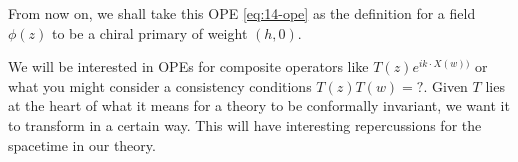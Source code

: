 From now on, we shall take this OPE \eqref{eq:14-ope} as the definition for a field $\phi(z)$ to be a chiral primary of weight $(h, 0)$.

We will be interested in OPEs for composite operators like $ T(z) e^{i k \cdot X(w))} $ or what you might consider a consistency conditions $T(z) T(w) = ?$.
Given $T$ lies at the heart of what it means for a theory to be conformally invariant, we want it to transform in a certain way. This will have interesting repercussions for the spacetime in our theory.
